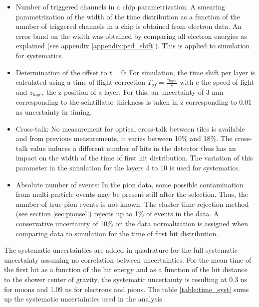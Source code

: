 \begin{itemize}
	\item Number of triggered channels in a chip parametrization: A smearing parametrization of the width of the time distribution as a function of the number of triggered channels in a chip is obtained from electron data. An error band on the width was obtained by comparing all electron energies as explained (see appendix \ref{appendix:ped_shift}). This is applied to simulation for systematics.
	\item Determination of the offset to $t=0$: For simulation, the time shift per layer is calculated using a time of flight correction $T_{of} = \frac{z_{layer}}{c}$ with $c$ the speed of light and $z_{layer}$ the z position of a layer. For this, an uncertainty of 3 mm corresponding to the scintillator thickness is taken in z corresponding to 0.01 ns uncertainty in timing.
	\item Cross-talk: No measurement for optical cross-talk between tiles is available and from previous measurements, it varies between 10\% and 18\%. The cross-talk value induces a different number of hits in the detector thus has an impact on the width of the time of first hit distribution. The variation of this parameter in the simulation for the layers 4 to 10 is used for systematics.
	\item Absolute number of events: In the pion data, some possible contamination from multi-particle events may be present still after the selection. Thus, the number of true pion events is not known. The cluster time rejection method (see section \ref{sec:pionsel}) rejects up to 1\% of events in the data. A conservative uncertainty of 10\% on the data normalization is assigned when comparing data to simulation for the time of first hit distribution.
\end{itemize}

The systematic uncertainties are added in quadrature for the full systematic uncertainty assuming no correlation between uncertainties. For the mean time of the first hit as a function of the hit energy and as a function of the hit distance to the shower center of gravity, the systematic uncertainty is resulting at 0.3 ns for muons and 1.09 ns for electrons and pions. The table \ref{table:time_syst} sums up the systematic uncertainties used in the analysis.

